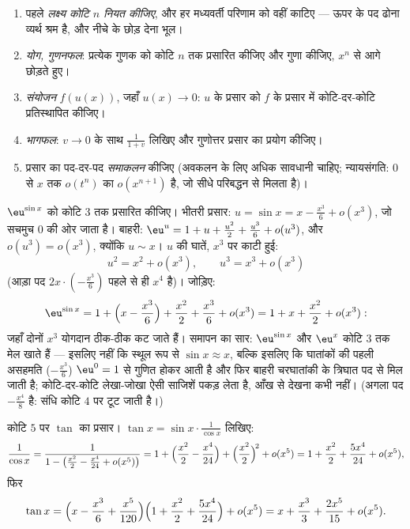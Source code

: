 \begin{method}[प्रसारों के साथ संगणना]\label{met:b1:taylor:compute}
\begin{enumerate}
  \item पहले \emph{लक्ष्य कोटि $n$ नियत कीजिए}, और हर मध्यवर्ती परिणाम को
  वहीं काटिए --- ऊपर के पद ढोना व्यर्थ श्रम है, और नीचे के छोड़ देना भूल।
  \item \emph{योग, गुणनफल}: प्रत्येक गुणक को कोटि $n$ तक प्रसारित कीजिए और
  गुणा कीजिए, $x^n$ से आगे छोड़ते हुए।
  \item \emph{संयोजन} $f(u(x))$, जहाँ $u(x) \to 0$: $u$ के प्रसार को $f$ के
  प्रसार में कोटि-दर-कोटि प्रतिस्थापित कीजिए।
  \item \emph{भागफल}: $v \to 0$ के साथ $\frac{1}{1 + v}$ लिखिए और गुणोत्तर
  प्रसार का प्रयोग कीजिए।
  \item प्रसार का पद-दर-पद \emph{समाकलन} कीजिए (अवकलन के लिए अधिक सावधानी
  चाहिए; न्यायसंगति: $0$ से $x$ तक $o(t^n)$ का  $o(x^{n+1})$ है, जो
  सीधे परिबद्धन से मिलता है)।
\end{enumerate}
\end{method}

\begin{example}[संयोजन, पूरे लेखा-जोखा के साथ]\label{ex:b1:taylor:esin}
$\eu^{\sin x}$ को कोटि $3$ तक प्रसारित कीजिए। भीतरी प्रसार: $u = \sin x = x
- \frac{x^3}{6} + o(x^3)$, जो सचमुच $0$ की ओर जाता है। बाहरी: $\eu^u = 1 + u
+ \frac{u^2}{2} + \frac{u^3}{6} + o(u^3)$, और $o(u^3) = o(x^3)$, क्योंकि $u
\sim x$। $u$ की घातें, $x^3$ पर काटी हुई:
\[
u^2 = x^2 + o(x^3), \qquad u^3 = x^3 + o(x^3)
\]
(आड़ा पद $2x\cdot(-\frac{x^3}{6})$ पहले से ही $x^4$ है)। जोड़िए:
\[
\eu^{\sin x} = 1 + \Bigl(x - \frac{x^3}{6}\Bigr) + \frac{x^2}{2}
+ \frac{x^3}{6} + o(x^3)
= 1 + x + \frac{x^2}{2} + o(x^3) :
\]
जहाँ दोनों $x^3$ योगदान ठीक-ठीक कट जाते हैं। समापन का सार: $\eu^{\sin x}$ और
$\eu^x$ कोटि $3$ तक मेल खाते हैं --- इसलिए नहीं कि स्थूल रूप से $\sin x
\approx x$, बल्कि इसलिए कि घातांकों की पहली असहमति ($-\frac{x^3}{6}$) $\eu^0
= 1$ से गुणित होकर आती है और फिर बाहरी चरघातांकी के त्रिघात पद से मिल जाती
है; कोटि-दर-कोटि लेखा-जोखा ऐसी साजिशें पकड़ लेता है, आँख से देखना कभी नहीं।
(अगला पद $-\frac{x^4}{8}$ है: संधि कोटि $4$ पर टूट जाती है।)
\end{example}

\begin{example}\label{ex:b1:taylor:tan}
कोटि $5$ पर $\tan$ का प्रसार। $\tan x = \sin x \cdot \frac{1}{\cos x}$
लिखिए:
\[
\frac{1}{\cos x} = \frac{1}{1 - \bigl(\frac{x^2}{2} - \frac{x^4}{24}
+ o(x^5)\bigr)}
= 1 + \Bigl(\frac{x^2}{2} - \frac{x^4}{24}\Bigr)
+ \Bigl(\frac{x^2}{2}\Bigr)^{\!2} + o(x^5)
= 1 + \frac{x^2}{2} + \frac{5x^4}{24} + o(x^5),
\]
फिर
\[
\tan x = \Bigl(x - \frac{x^3}{6} + \frac{x^5}{120}\Bigr)
\Bigl(1 + \frac{x^2}{2} + \frac{5x^4}{24}\Bigr) + o(x^5)
= x + \frac{x^3}{3} + \frac{2x^5}{15} + o(x^5) .
\]
\end{example}

